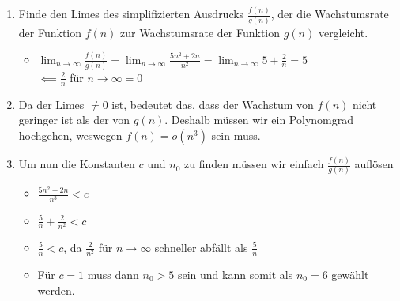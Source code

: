 \documentclass[
../../AuD-Zusammenfassung.tex,
]
{subfiles}
\begin{document}
\begin{enumerate}
    \item Finde den Limes des simplifizierten Ausdrucks $\frac{f(n)}{g(n)}$, der die Wachstumsrate der Funktion $f(n)$ zur Wachstumsrate der Funktion $g(n)$ vergleicht.
    \begin{itemize}
        \item $\lim_{n \to \infty} \frac{f(n)}{g(n)} = \lim_{n \to \infty} \frac{5n^2 + 2n}{n^2} = \lim_{n \to \infty} 5 + \frac{2}{n} = 5$\\
        $\impliedby \frac{2}{n}$ für $n \to \infty = 0$ 
    \end{itemize}
    \item Da der Limes $\not= 0$ ist, bedeutet das, dass der Wachstum von $f(n)$ nicht geringer ist als der von $g(n)$. Deshalb müssen wir ein Polynomgrad hochgehen, weswegen $f(n) = o(n^3)$ sein muss. 
    \item Um nun die Konstanten $c$ und $n_0$ zu finden müssen wir einfach $\frac{f(n)}{g(n)}$ auflösen
    \begin{itemize}
        \item $\frac{5n^2 + 2n}{n^3} < c$
        \item $\frac{5}{n} + \frac{2}{n^2} < c$
        \item $\frac{5}{n} < c$, da $\frac{2}{n^2}$ für $n \to \infty$ schneller abfällt als $\frac{5}{n}$
        \item Für $c = 1$ muss dann $n_0 > 5$ sein und kann somit als $n_0 = 6$ gewählt werden.
    \end{itemize}
\end{enumerate}
\end{document}
